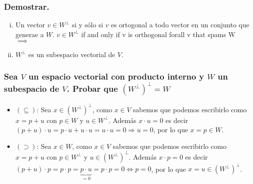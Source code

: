 \documentclass{article}
\begin{document}
\subsubsection{Demostrar.}
\begin{enumerate}[i.]
\item
	Un vector $v \in W^\bot$ si y sólo si $v$ es ortogonal a todo vector en un conjunto que generae a $W$.
	$v \in W^\bot$ if and only if v is orthogonal forall v that spams W $\implies$











\item
	$W^\bot$ es un subespacio vectorial de $V$.
\end{enumerate}
\subsubsection{Sea $V$ un espacio vectorial con producto interno y $W$ un subespacio de $V$. Probar que
$(W^\bot)^\bot = W$}
\begin{itemize}
\item
	$(\subseteq)$: Sea $x \in (W^\bot)^\bot$, como $x \in V$ sabemos que podemos escribirlo como 
	$x = p+u$ con $p \in W$ y $u \in W^\bot$. Además $x \cdot u = 0$ es decir
	 $(p+u)\cdot u = p \cdot u + u \cdot u = u \cdot u = 0 \Longrightarrow u = 0$, por lo que
	$x = p \in W$.
\item
	$(\supset)$: Sea $x \in W$, como $x \in V$ sabemos que podemos escribirlo como $x = p+u$
	con $p \in W^\bot$ y $u \in (W^\bot)^\bot$. Además $x \cdot p = 0$ es decir $(p+u)\cdot p =
	p \cdot p = \underbrace{p \cdot u}_{= 0} = p \cdot p = 0 \Longleftrightarrow p = 0$, por lo
	que $x = u \in (W^\bot)^\bot$.
\end{itemize}
\end{document}
